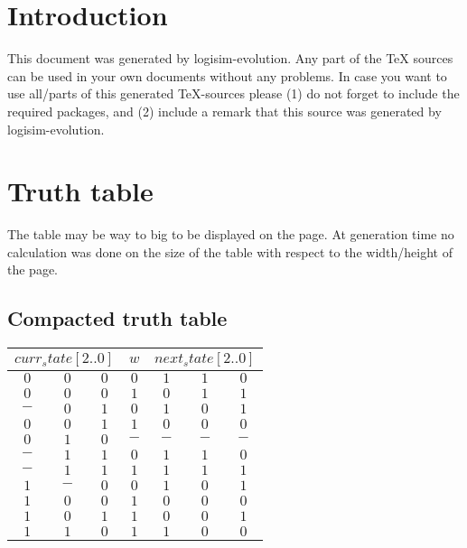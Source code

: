 \documentclass [15pt,a4paper,twoside]{article}
\begin{document}
\section{Introduction}
This document was generated by logisim-evolution. Any part of the TeX sources can be used in your own documents without any problems. In case you want to use all/parts of this generated TeX-sources please (1) do not forget to include the required packages, and (2) include a remark that this source was generated by logisim-evolution.
\section{Truth table}
The table may be way to big to be displayed on the page. At generation time no calculation was done on the size of the table with respect to the width/height of the page.
\subsection{Compacted truth table}
\begin{center}
\begin{tabular}{cccc|ccc}
\multicolumn{3}{c}{$curr_state[2..0]$}&$w$&\multicolumn{3}{c}{$next_state[2..0]$}\\
\hline
$0$&$0$&$0$&$0$&$1$&$1$&$0$\\
$0$&$0$&$0$&$1$&$0$&$1$&$1$\\
$-$&$0$&$1$&$0$&$1$&$0$&$1$\\
$0$&$0$&$1$&$1$&$0$&$0$&$0$\\
$0$&$1$&$0$&$-$&$-$&$-$&$-$\\
$-$&$1$&$1$&$0$&$1$&$1$&$0$\\
$-$&$1$&$1$&$1$&$1$&$1$&$1$\\
$1$&$-$&$0$&$0$&$1$&$0$&$1$\\
$1$&$0$&$0$&$1$&$0$&$0$&$0$\\
$1$&$0$&$1$&$1$&$0$&$0$&$1$\\
$1$&$1$&$0$&$1$&$1$&$0$&$0$\\

\end{tabular}
\end{center}
\end{document}
